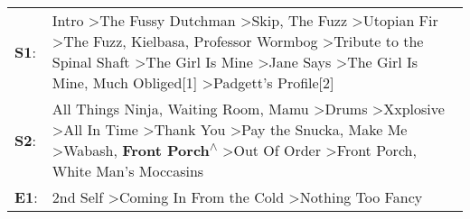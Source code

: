 \begin{supertabular}{p{0.03\textwidth}p{0.92\textwidth}}
 \textbf{S1}:  &  Intro\textsuperscript{} \textgreater \enspace The Fussy Dutchman\textsuperscript{} \textgreater \enspace Skip\textsuperscript{}, \enspace The Fuzz\textsuperscript{} \textgreater \enspace Utopian Fir\textsuperscript{} \textgreater \enspace The Fuzz\textsuperscript{}, \enspace Kielbasa\textsuperscript{}, \enspace Professor Wormbog\textsuperscript{} \textgreater \enspace Tribute to the Spinal Shaft\textsuperscript{} \textgreater \enspace The Girl Is Mine\textsuperscript{} \textgreater \enspace Jane Says\textsuperscript{} \textgreater \enspace The Girl Is Mine\textsuperscript{}, \enspace Much Obliged[1]\textsuperscript{} \textgreater \enspace Padgett's Profile[2]\textsuperscript{}  \enspace  \\
 \textbf{S2}:  &                               All Things Ninja\textsuperscript{}, \enspace Waiting Room\textsuperscript{}, \enspace Mamu\textsuperscript{} \textgreater \enspace Drums\textsuperscript{} \textgreater \enspace Xxplosive\textsuperscript{} \textgreater \enspace All In Time\textsuperscript{} \textgreater \enspace Thank You\textsuperscript{} \textgreater \enspace Pay the Snucka\textsuperscript{}, \enspace Make Me\textsuperscript{} \textgreater \enspace Wabash\textsuperscript{}, \enspace \textbf{Front Porch\textsuperscript{$\wedge$}} \textgreater \enspace Out Of Order\textsuperscript{} \textgreater \enspace Front Porch\textsuperscript{}, \enspace White Man's Moccasins\textsuperscript{}  \enspace  \\
 \textbf{E1}:  &                                                                                                                                                                                                                                                                                                                                                                                                                                                                                                                                                           2nd Self\textsuperscript{} \textgreater \enspace Coming In From the Cold\textsuperscript{} \textgreater \enspace Nothing Too Fancy\textsuperscript{}  \enspace  \\
\end{supertabular}
